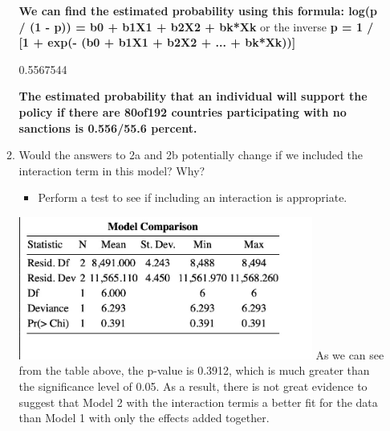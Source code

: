 \documentclass[12pt,letterpaper]{article}
\begin{document}
\begin{enumerate}
\begin{enumerate}
\textbf{\textbf{We can find the estimated probability using this formula:}	log(p / (1 - p)) = b0 + b1X1 + b2X2 + bk*Xk} 
or the inverse \textbf{p = 1 / [1 + exp(- (b0 + b1X1 + b2X2 + ... + bk*Xk))]}
		 

0.5567544

\textbf{The estimated probability that an individual will support the policy if there are 80of192 countries participating with no sanctions is 0.556/55.6 percent.}
\vspace{.8cm}
		\item
		Would the answers to 2a and 2b potentially change if we included the interaction term in this model? Why? 
		\begin{itemize}
			\item Perform a test to see if including an interaction is appropriate.
		\end{itemize}
		 
		\includegraphics[width=0.8\textwidth]{model_comparison.jpg}
		\linebreak
As we can see from the table above, the p-value is 0.3912, which is much greater than the significance level of 0.05. As a result, there is not great evidence to suggest that Model 2 with the interaction termis a better fit for the data than Model 1 with only the effects added together. 
	
	\end{enumerate}
	\end{enumerate}
\end{document}
